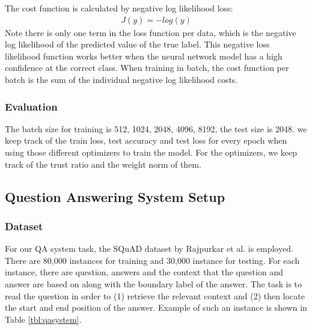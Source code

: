 The cost function is calculated by negative log likelihood loss:
\begin{align*}
    J(y) = -log(y) 
\end{align*}
Note there is only one term in the loss function per data, which is the negative log likelihood of the predicted value of the true label. This negative loss likelihood function works better when the neural network model has a high confidence at the correct class. When training in batch, the cost function per batch is the sum of the individual negative log likelihood costs.

\subsubsection{Evaluation}



The batch size for training is {512, 1024, 2048, 4096, 8192}, the test size is 2048. we keep track of the train loss, test accuracy and test loss for every epoch when using those different optimizers to train the model. For the optimizers, we keep track of the trust ratio and the weight norm of them.


\subsection{Question Answering System Setup}

\subsubsection{Dataset}

For our QA system task, the SQuAD dataset by Rajpurkar et al. \cite{squad} is employed. There are 80,000 instances for training and 30,000 instance for testing. For each instance, there are question, answers and the context that the question and answer are based on along with the boundary label of the answer. The task is to read the question in order to (1) retrieve the relevant context and (2) then locate the start and end position of the answer. Example of such an instance is shown in Table \ref{tbl:qasystem}. 

